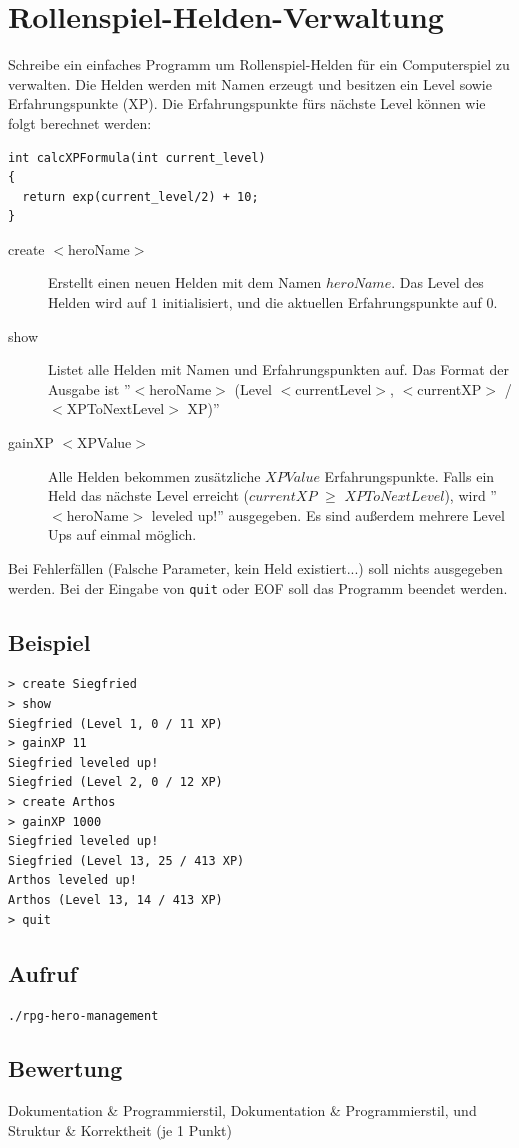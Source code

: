 \documentclass[a4paper,10pt]{article}
\begin{document}
\section*{Rollenspiel-Helden-Verwaltung}

Schreibe ein einfaches Programm um Rollenspiel-Helden für ein Computerspiel zu verwalten. Die Helden werden mit Namen erzeugt und besitzen ein Level sowie Erfahrungspunkte (XP). Die Erfahrungspunkte fürs nächste Level können wie folgt berechnet werden:

\begin{lstlisting}[basicstyle=\footnotesize]
int calcXPFormula(int current_level)
{
  return exp(current_level/2) + 10;
}
\end{lstlisting}

\begin{description}
 \item[create $<$heroName$>$] Erstellt einen neuen Helden mit dem Namen $heroName$. Das Level des Helden wird auf $1$ initialisiert, und die aktuellen Erfahrungspunkte auf $0$.
 \item[show] Listet alle Helden mit Namen und Erfahrungspunkten auf. Das Format der Ausgabe ist ''$<$heroName$>$ (Level $<$currentLevel$>$, $<$currentXP$>$ / $<$XPToNextLevel$>$ XP)''
 \item[gainXP $<$XPValue$>$] Alle Helden bekommen zusätzliche $XPValue$ Erfahrungspunkte. Falls ein Held das nächste Level erreicht ($currentXP$ $\geq$ $XPToNextLevel$), wird ''$<$heroName$>$ leveled up!'' ausgegeben. Es sind außerdem mehrere Level Ups auf einmal möglich.
\end{description}
Bei Fehlerfällen (Falsche Parameter, kein Held existiert...) soll nichts ausgegeben werden.
Bei der Eingabe von \texttt{quit} oder EOF soll das Programm beendet werden.

\subsection*{Beispiel}
\begin{verbatim}
> create Siegfried
> show
Siegfried (Level 1, 0 / 11 XP)
> gainXP 11
Siegfried leveled up!
Siegfried (Level 2, 0 / 12 XP)
> create Arthos
> gainXP 1000
Siegfried leveled up!
Siegfried (Level 13, 25 / 413 XP)
Arthos leveled up!
Arthos (Level 13, 14 / 413 XP)
> quit
\end{verbatim}

\subsection*{Aufruf}
\texttt{./rpg-hero-management}

\subsection*{Bewertung}
Dokumentation \& Programmierstil,  Dokumentation \& Programmierstil, und Struktur \& Korrektheit (je 1 Punkt)
\newpage
\end{document}
